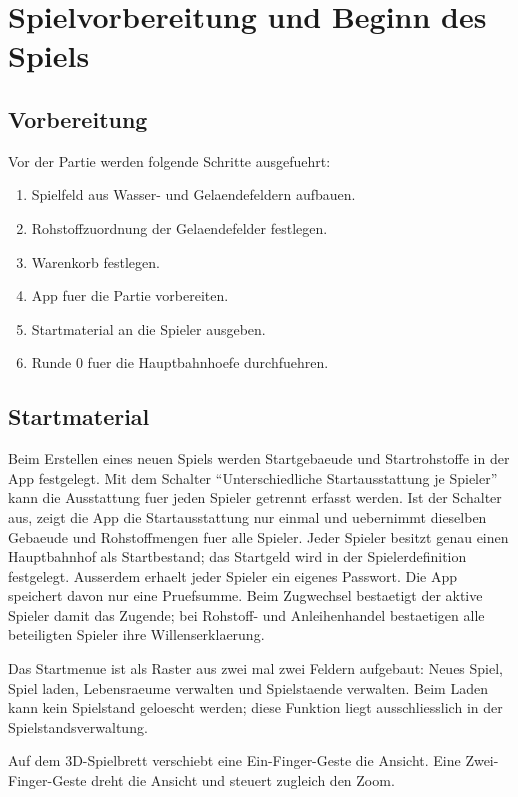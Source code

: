 \documentclass[11pt,a4paper,oneside,parskip=half]{scrreprt}
\begin{document}
\chapter{Spielvorbereitung und Beginn des Spiels}

\section{Vorbereitung}
Vor der Partie werden folgende Schritte ausgefuehrt:
\begin{enumerate}
  \item Spielfeld aus Wasser- und Gelaendefeldern aufbauen.
  \item Rohstoffzuordnung der Gelaendefelder festlegen.
  \item Warenkorb festlegen.
  \item App fuer die Partie vorbereiten.
  \item Startmaterial an die Spieler ausgeben.
  \item Runde 0 fuer die Hauptbahnhoefe durchfuehren.
\end{enumerate}

\section{Startmaterial}
Beim Erstellen eines neuen Spiels werden Startgebaeude und Startrohstoffe in der
App festgelegt. Mit dem Schalter \enquote{Unterschiedliche Startausstattung je
Spieler} kann die Ausstattung fuer jeden Spieler getrennt erfasst werden. Ist der
Schalter aus, zeigt die App die Startausstattung nur einmal und uebernimmt dieselben
Gebaeude und Rohstoffmengen fuer alle Spieler. Jeder Spieler besitzt genau einen
Hauptbahnhof als Startbestand; das Startgeld wird in der Spielerdefinition festgelegt.
Ausserdem erhaelt jeder Spieler ein eigenes Passwort. Die App speichert davon nur
eine Pruefsumme. Beim Zugwechsel bestaetigt der aktive Spieler damit das Zugende;
bei Rohstoff- und Anleihenhandel bestaetigen alle beteiligten Spieler ihre
Willenserklaerung.

Das Startmenue ist als Raster aus zwei mal zwei Feldern aufgebaut: Neues Spiel,
Spiel laden, Lebensraeume verwalten und Spielstaende verwalten. Beim Laden kann
kein Spielstand geloescht werden; diese Funktion liegt ausschliesslich in der
Spielstandsverwaltung.

Auf dem 3D-Spielbrett verschiebt eine Ein-Finger-Geste die Ansicht. Eine
Zwei-Finger-Geste dreht die Ansicht und steuert zugleich den Zoom.
\end{document}
